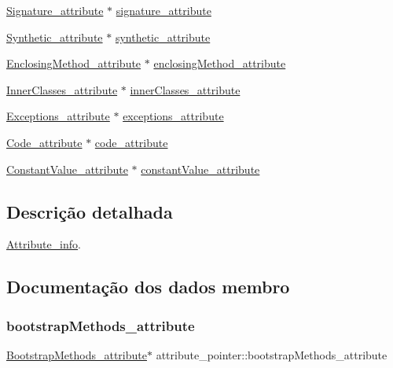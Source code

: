 \begin{DoxyCompactItemize}
\hyperlink{struct_signature__attribute}{Signature\+\_\+attribute} $\ast$ \hyperlink{unionattribute__pointer_a2b70c1eb93cfc0cf9ad2070fe4ba3441}{signature\+\_\+attribute}
\item 
\hyperlink{struct_synthetic__attribute}{Synthetic\+\_\+attribute} $\ast$ \hyperlink{unionattribute__pointer_a401c47044c8871e4c8f5a6db9d8d8139}{synthetic\+\_\+attribute}
\item 
\hyperlink{struct_enclosing_method__attribute}{Enclosing\+Method\+\_\+attribute} $\ast$ \hyperlink{unionattribute__pointer_a2c54b10a006bbd4ed3ae83dbb1cdf8e9}{enclosing\+Method\+\_\+attribute}
\item 
\hyperlink{struct_inner_classes__attribute}{Inner\+Classes\+\_\+attribute} $\ast$ \hyperlink{unionattribute__pointer_a053d5fd49a841c9710aacb6541b01976}{inner\+Classes\+\_\+attribute}
\item 
\hyperlink{struct_exceptions__attribute}{Exceptions\+\_\+attribute} $\ast$ \hyperlink{unionattribute__pointer_a1d45eae92b5683e363e39016bd04d528}{exceptions\+\_\+attribute}
\item 
\hyperlink{struct_code__attribute}{Code\+\_\+attribute} $\ast$ \hyperlink{unionattribute__pointer_a620a646b296f0e4a073154c4fa366fbb}{code\+\_\+attribute}
\item 
\hyperlink{struct_constant_value__attribute}{Constant\+Value\+\_\+attribute} $\ast$ \hyperlink{unionattribute__pointer_a8663de3142bac31a864348e70dfbf0d6}{constant\+Value\+\_\+attribute}
\end{DoxyCompactItemize}


\subsection{Descrição detalhada}
\hyperlink{struct_attribute__info}{Attribute\+\_\+info}. 

\subsection{Documentação dos dados membro}
\hypertarget{unionattribute__pointer_a8c5dd68e9d26cf4693af6d45ca90e1bf}{}\label{unionattribute__pointer_a8c5dd68e9d26cf4693af6d45ca90e1bf} 
\subsubsection{\texorpdfstring{bootstrap\+Methods\+\_\+attribute}{bootstrapMethods\_attribute}}
{\footnotesize\ttfamily \hyperlink{struct_bootstrap_methods__attribute}{Bootstrap\+Methods\+\_\+attribute}$\ast$ attribute\+\_\+pointer\+::bootstrap\+Methods\+\_\+attribute}

